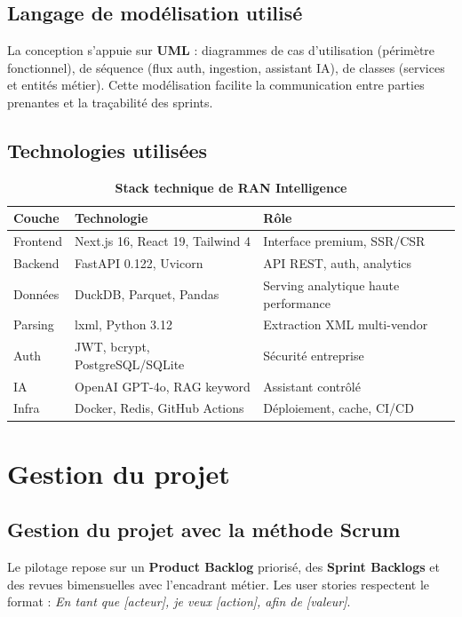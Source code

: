 \documentclass[12pt,a4paper]{report}
\begin{document}
\subsection{Langage de modélisation utilisé}\label{sec:ch2-uml}
La conception s'appuie sur \textbf{UML} : diagrammes de cas d'utilisation (périmètre fonctionnel), de séquence (flux auth, ingestion, assistant IA), de classes (services et entités métier). Cette modélisation facilite la communication entre parties prenantes et la traçabilité des sprints.

\subsection{Technologies utilisées}\label{sec:ch2-tech}

\begin{table}[H]\centering\caption{\textbf{Stack technique de RAN Intelligence}}\label{tab:stack}
\renewcommand{\arraystretch}{1.12}
\begin{tabular}{|p{3.5cm}|p{4.2cm}|p{6.5cm}|}
\hline\rowcolor[RGB]{220,0,0}\color{white}\textbf{Couche}&\color{white}\textbf{Technologie}&\color{white}\textbf{Rôle}\\\hline
Frontend & Next.js 16, React 19, Tailwind 4 & Interface premium, SSR/CSR \\\hline
Backend & FastAPI 0.122, Uvicorn & API REST, auth, analytics \\\hline
Données & DuckDB, Parquet, Pandas & Serving analytique haute performance \\\hline
Parsing & lxml, Python 3.12 & Extraction XML multi-vendor \\\hline
Auth & JWT, bcrypt, PostgreSQL/SQLite & Sécurité entreprise \\\hline
IA & OpenAI GPT-4o, RAG keyword & Assistant contrôlé \\\hline
Infra & Docker, Redis, GitHub Actions & Déploiement, cache, CI/CD \\\hline
\end{tabular}
\end{table}

\section{Gestion du projet}\label{sec:ch2-gestion}

\subsection{Gestion du projet avec la méthode Scrum}
Le pilotage repose sur un \textbf{Product Backlog} priorisé, des \textbf{Sprint Backlogs} et des revues bimensuelles avec l'encadrant métier. Les user stories respectent le format : \textit{En tant que [acteur], je veux [action], afin de [valeur]}.
\end{document}
